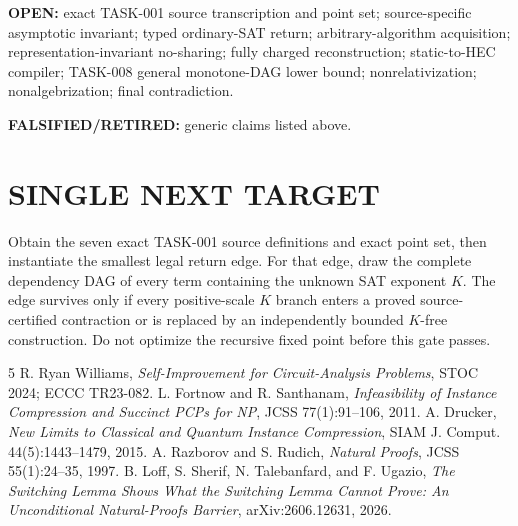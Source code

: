 \documentclass[11pt]{article}
\begin{document}
\textbf{OPEN:} exact TASK-001 source transcription and point set; source-specific asymptotic invariant; typed ordinary-SAT return; arbitrary-algorithm acquisition; representation-invariant no-sharing; fully charged reconstruction; static-to-HEC compiler; TASK-008 general monotone-DAG lower bound; nonrelativization; nonalgebrization; final contradiction.

\textbf{FALSIFIED/RETIRED:} generic claims listed above.

\section*{SINGLE NEXT TARGET}
Obtain the seven exact TASK-001 source definitions and exact point set, then instantiate the smallest legal return edge. For that edge, draw the complete dependency DAG of every term containing the unknown SAT exponent \(K\). The edge survives only if every positive-scale \(K\) branch enters a proved source-certified contraction or is replaced by an independently bounded \(K\)-free construction. Do not optimize the recursive fixed point before this gate passes.

\begin{thebibliography}{5}
 R. Ryan Williams, \emph{Self-Improvement for Circuit-Analysis Problems}, STOC 2024; ECCC TR23-082.
 L. Fortnow and R. Santhanam, \emph{Infeasibility of Instance Compression and Succinct PCPs for NP}, JCSS 77(1):91--106, 2011.
 A. Drucker, \emph{New Limits to Classical and Quantum Instance Compression}, SIAM J. Comput. 44(5):1443--1479, 2015.
 A. Razborov and S. Rudich, \emph{Natural Proofs}, JCSS 55(1):24--35, 1997.
 B. Loff, S. Sherif, N. Talebanfard, and F. Ugazio, \emph{The Switching Lemma Shows What the Switching Lemma Cannot Prove: An Unconditional Natural-Proofs Barrier}, arXiv:2606.12631, 2026.
\end{thebibliography}
\end{document}
